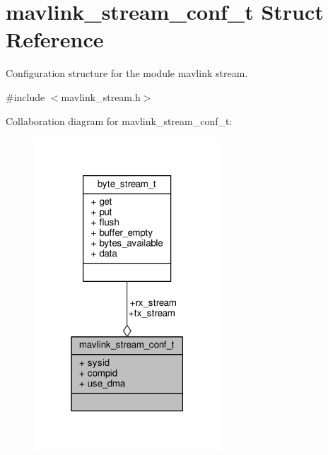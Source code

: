\hypertarget{structmavlink__stream__conf__t}{\section{mavlink\+\_\+stream\+\_\+conf\+\_\+t Struct Reference}
\label{structmavlink__stream__conf__t}
}


Configuration structure for the module mavlink stream.  




{\ttfamily \#include $<$mavlink\+\_\+stream.\+h$>$}



Collaboration diagram for mavlink\+\_\+stream\+\_\+conf\+\_\+t\+:
\nopagebreak
\begin{figure}[H]
\begin{center}
\leavevmode
\includegraphics[width=198pt]{structmavlink__stream__conf__t__coll__graph}
\end{center}
\end{figure}

